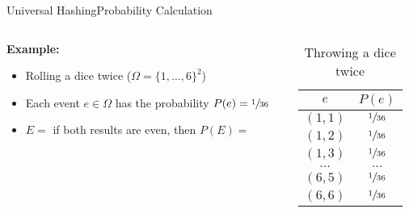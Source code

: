 \begin{frame}{Universal Hashing}{Probability Calculation}
  \begin{columns}
    \begin{column}{0.65\linewidth}
      \textbf{Example:}
      \begin{itemize}
        \item<2->
          Rolling a dice twice ({\color{MainA}$\Omega = \{1,\dots,6\}^2$})
        \item<3->
          Each event {\color{MainA}$e \in \Omega$} has the probability
          {\color{MainA}$P(e) = \sfrac{1}{36}$}
        \item<4->
          {\color{MainA}$E =$} if both results are even,
          then {\color{MainA}$P(E)=$}
      \end{itemize}
    \end{column}
    \begin{column}{0.35\linewidth}
      \begin{table}[!h]
        \caption{Throwing a dice twice}
        \label{tab:probabilities_rolling_dice_twice}
        \begin{tabularx}{0.8\linewidth}{c|c}
          {\color{MainA}$e$} & {\color{MainA} $P(e)$}\\
          \midrule
          $(1, 1)$ & $\sfrac{1}{36}$\\
          $(1, 2)$ & $\sfrac{1}{36}$\\
          $(1, 3)$ & $\sfrac{1}{36}$\\
          $\dots$ & $\dots$\\
          $(6, 5)$ & $\sfrac{1}{36}$\\
          $(6, 6)$ & $\sfrac{1}{36}$\\
        \end{tabularx}
      \end{table}
    \end{column}
  \end{columns}
\end{frame}


